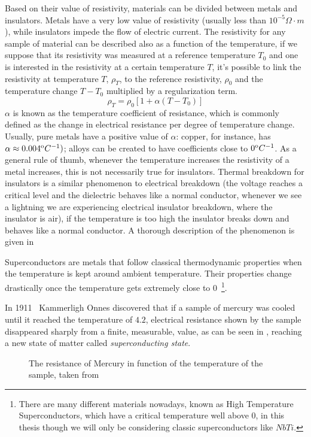 Based on their value of resistivity, materials can be divided between metals and insulators. Metals
have a very low value of resistivity (usually less than $10^{-5}\Omega\cdot m$), while insulators impede the
flow of electric current. The resistivity for any sample of material can be described also as a
function of the temperature, if we suppose that its resistivity was measured at a reference
temperature $T_0$ and one is interested in the resistivity at a certain temperature $T$, it's
possible to link the resistivity at temperature $T$, $\rho_T$, to the reference resistivity,
$\rho_0$ and the temperature change $T - T_0$ multiplied by a regularization term.
\begin{equation}
	\label{eq:resistivity-func-of-temp}
	\rho_T = \rho_0[1 + \alpha(T - T_0)]
\end{equation}
$\alpha$ is known as the temperature coefficient of resistance, which is commonly defined as the
change in electrical resistance per degree of temperature change. Usually, pure metals have a
positive value of $\alpha$: copper, for instance, has $\alpha \approx 0.004^\text{o}C^{-1})$; alloys can be
created to have coefficients close to $0^\text{o}C^{-1}$. As a general rule of thumb, whenever the
temperature increases the resistivity of a metal increases, this is not necessarily
true for insulators. Thermal breakdown for insulators is a similar phenomenon to electrical
breakdown (the voltage reaches a critical level and the dielectric behaves like a normal conductor,
whenever we see a lightning we are experiencing electrical insulator breakdown, where the insulator
is air), if the temperature is too high the insulator breaks down and behaves like a normal conductor. A thorough description of the phenomenon is given in~\cite{kuvyrkin2022}

Superconductors are metals that follow classical thermodynamic properties when the temperature is
kept around ambient temperature. Their properties change drastically once the temperature gets
extremely close to $0$\K~\footnote{
	There are many different materials nowadays, known as High Temperature
	Superconductors, which have a critical temperature well above $0$\K, in this thesis though we will
	only be considering classic superconductors like $NbTi$.
}.

In 1911~\cite{invention-superconductivity} Kammerligh Onnes discovered that if a sample of mercury was cooled
until it reached the temperature of $4.2$\K, electrical resistance shown by the sample disappeared
sharply from a finite, measurable, value, as can be seen in , reaching
a new state of matter called \emph{superconducting state}.
\begin{figure}[!ht]
	\centering
	
	\caption{The resistance of Mercury in function of the temperature of the sample, taken from~\cite{tsukerman2020compendium}}
	\label{img:mercury-resistance}
\end{figure}

